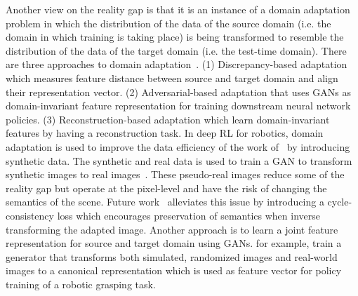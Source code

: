 \documentclass[\home/main.tex]{subfiles}
\begin{document}
Another view on the reality gap is that it is an instance of a domain adaptation problem in which the distribution of the data of the source domain (i.e. the domain in which training is taking place) is being transformed to resemble the distribution of the data of the target domain (i.e. the test-time domain). There are three approaches to domain adaptation~\autocite{Zhao2020}. (1) Discrepancy-based adaptation which measures feature distance between source and target domain and align their representation vector. (2) Adversarial-based adaptation that uses \glspl{GAN} as domain-invariant feature representation for training downstream neural network policies. (3) Reconstruction-based adaptation which learn domain-invariant features by having a reconstruction task.
In deep RL for robotics, domain adaptation is used to improve the data efficiency of the work of~\autocite{Levine2016} by introducing synthetic data. The synthetic and real data is used to train a \gls{GAN} to transform synthetic images to real images~\autocite{bousmalis2018using}. These pseudo-real images reduce some of the reality gap but operate at the pixel-level and have the risk of changing the semantics of the scene. Future work~\autocite{rao2020rl} alleviates this issue by introducing a cycle-consistency loss which encourages preservation of semantics when inverse transforming the adapted image. Another approach is to learn a joint feature representation for source and target domain using \glspl{GAN}.\Textcite{james2019sim} for example, train a generator that transforms both simulated, randomized images and real-world images to a canonical representation which is used as feature vector for policy training of a robotic grasping task. 
\end{document}
